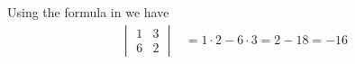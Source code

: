 Using the formula in  we have
%
\begin{align*}
\begin{vmatrix}1 & 3 \\ 6 & 2 \end{vmatrix} 
&= 1 \cdot 2 - 6 \cdot 3 = 2 - 18 = -16
\end{align*}
%